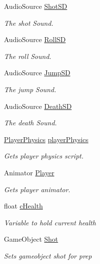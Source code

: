 \begin{DoxyCompactItemize}
Audio\-Source \hyperlink{classPlayerController_aa985596607cf22753896610372c00fa7}{Shot\-S\-D}
\begin{DoxyCompactList}\small\item\em The shot Sound. \end{DoxyCompactList}\item 
Audio\-Source \hyperlink{classPlayerController_a205f3898c18c6338d4e12f33222d90f5}{Roll\-S\-D}
\begin{DoxyCompactList}\small\item\em The roll Sound. \end{DoxyCompactList}\item 
Audio\-Source \hyperlink{classPlayerController_a3f516eecb6942aa1ec667de83154d350}{Jump\-S\-D}
\begin{DoxyCompactList}\small\item\em The jump Sound. \end{DoxyCompactList}\item 
Audio\-Source \hyperlink{classPlayerController_ac991ebede5b7666a4dcfefbd73114393}{Death\-S\-D}
\begin{DoxyCompactList}\small\item\em The death Sound. \end{DoxyCompactList}\item 
\hyperlink{classPlayerPhysics}{Player\-Physics} \hyperlink{classPlayerController_a039e255582f5fb656710b996fce4667e}{player\-Physics}
\begin{DoxyCompactList}\small\item\em Gets player physics script. \end{DoxyCompactList}\item 
Animator \hyperlink{classPlayerController_af6d2c371d77ff294a3840e6e26608e24}{Player}
\begin{DoxyCompactList}\small\item\em Gets player animator. \end{DoxyCompactList}\item 
float \hyperlink{classPlayerController_a499b06bd0da8f827bba77d2778814ece}{c\-Health}
\begin{DoxyCompactList}\small\item\em Variable to hold current health \end{DoxyCompactList}\item 
Game\-Object \hyperlink{classPlayerController_aabcb743694c264c111b2aa92c6f04dca}{Shot}
\begin{DoxyCompactList}\small\item\em Sets gameobject shot for prep \end{DoxyCompactList}\end{DoxyCompactItemize}


